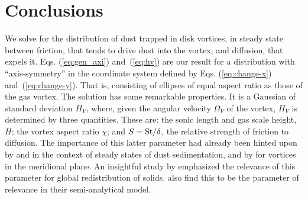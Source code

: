 \documentclass[apj]{emulateapj}
\def\blue#1{\textcolor{blue}{#1}}
\newcommand{\Eqs}[2]{Eqs. (\ref{#1}) and~(\ref{#2})}
\newcommand{\eqs}[2]{\Eqs{#1}{#2}}
\newcommand{\beq}{\begin{equation}}
\newcommand{\eeq}{\end{equation}}
\newcommand{\St}{{\rm St}}
\begin{document}










\section{Conclusions}

We solve for the distribution of dust trapped in
disk vortices, in steady state between friction, that 
tends to drive dust into the vortex, and diffusion, that expels
it. \eqs{eq:gen_axi}{eq:hv} are our result for a distribution with
``axis-symmetry''  in the coordinate system defined by
\eqs{eq:change-x}{eq:change-y}. That is, consisting of ellipses of
equal aspect ratio as those of the gas vortex. The solution has some remarkable
properties. It is a Gaussian of standard deviation $H_V$, where, given
the angular velocity $\varOmega_V$ of the vortex, $H_V$
is determined by three quantities. These are: 
the sonic length and gas scale height, $H$; the vortex aspect ratio
$\chi$; and \blue{$S=\St/\delta$}, the relative strength of friction to
diffusion. The importance of this latter parameter had already been 
hinted upon by \citet{Cuzzi93} and \citet{Dubrulle95} 
in the context of steady states of dust sedimentation, and by
\citet{Klahr-Henning97} for vortices in the meridional plane. An insightful study by 
\citet{Jacquet12} emphasized the relevance of this parameter for 
global redistribution of solids. \citet{Birnstiel13} also find this to be 
the parameter of relevance in their semi-analytical model.
\end{document}
